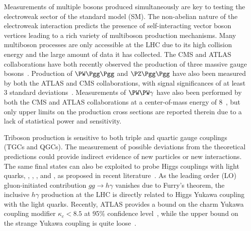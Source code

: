 
\maketitle 

Measurements of multiple bosons produced simultaneously are key to testing the electroweak sector of the standard model (SM). The non-abelian nature of the electroweak interaction predicts the presence of self-interacting vector boson vertices leading to a rich variety of multiboson production mechanisms. Many multiboson processes are only accessible at the LHC due to its high collision energy and the large amount of data it has collected. The CMS and ATLAS collaborations have both recently observed the production of three massive gauge bosons~\cite{CMS:2020hjs,ATLAS:2021atz}.  Production of $\PW\Pgg\Pgg$ and $\PZ\Pgg\Pgg$ have also been measured by both the ATLAS and CMS collaborations, with signal significances of at least 3 standard deviations~\cite{ATLAS:2015ify,ATLAS:2016qjc,CMS:2017tzy,CMS:2021jji}. Measurements of $\PW\PW\gamma$ have also been performed by both the CMS and ATLAS collaborations at a center-of-mass energy of 8\TeV~\cite{CMS:2014cdf,ATLAS:2017bon}, but only upper limits on the production cross sections are reported therein due to a lack of statistical power and sensitivity.

Triboson production is sensitive to both triple and quartic gauge couplings (TGCs and QGCs). The measurement of possible deviations from the theoretical predictions could provide indirect evidence of new particles or new interactions. The same final states can also be exploited to probe Higgs couplings with light quarks, \PQc, \PQs, \PQu, and \PQd, as proposed in recent literature~\cite{Khanpour:2017inb,Aguilar-Saavedra:2020rgo,Falkowski:2020znk}. As the leading order (LO) gluon-initiated contribution $gg\rightarrow h\gamma$ vanishes due to Furry’s theorem, the inclusive $h\gamma$ production at the LHC is directly related to Higgs Yukawa coupling with the light quarks. Recently, ATLAS provides a bound on the charm Yukawa coupling modifier $\kappa_c<8.5$ at 95\% confidence level~\cite{ATLAS:2021zwx}, while the upper bound on the strange Yukawa coupling is quite loose~\cite{Duarte-Campderros:2018ouv,ATLAS:2018xfc}.

